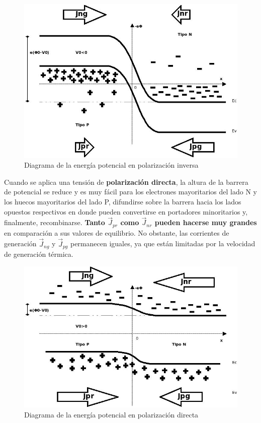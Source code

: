 \documentclass[oneside]{book}
\numberwithin{equation}{section}
\numberwithin{figure}{section}
\numberwithin{table}{section}
\begin{document}
				\begin{figure}[H]
					\begin{center}
						\includegraphics[scale=0.5]{Juntura-inv.jpeg}
						\caption{Diagrama de la energía potencial en polarización inversa}
					\end{center}
				\end{figure}						
				
				
				Cuando se aplica una tensión de \textbf{polarización directa}, la altura de la barrera de potencial se reduce y es muy fácil para los electrones mayoritarios del lado N y los huecos mayoritarios del lado P, difundirse sobre la barrera hacia los lados opuestos respectivos en donde pueden convertirse en portadores minoritarios y, finalmente, recombinarse. \textbf{Tanto $\vec{J}_{pr}$ como $\vec{J}_{nr}$ pueden hacerse muy grandes} en comparación a sus valores de equilibrio. No obstante, las corrientes de generación $\vec{J}_{ng}$ y $\vec{J}_{pg}$ permanecen iguales, ya que están limitadas por la velocidad de generación térmica.\\
				
				\begin{figure}[H]
					\begin{center}
						\includegraphics[scale=0.5]{Juntura-dir.jpeg}
						\caption{Diagrama de la energía potencial en polarización directa}
					\end{center}
				\end{figure}				
				
\end{document}
